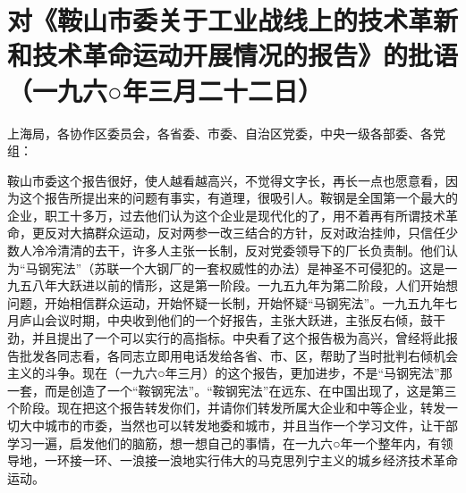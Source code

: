 \section[对《鞍山市委关于工业战线上的技术革新和技术革命运动开展情况的报告》的批语（一九六○年三月二十二日）]{对《鞍山市委关于工业战线上的技术革新和技术革命运动开展情况的报告》的批语（一九六○年三月二十二日）}


上海局，各协作区委员会，各省委、市委、自治区党委，中央一级各部委、各党组：

鞍山市委这个报告很好，使人越看越高兴，不觉得文字长，再长一点也愿意看，因为这个报告所提出来的问题有事实，有道理，很吸引人。鞍钢是全国第一个最大的企业，职工十多万，过去他们认为这个企业是现代化的了，用不着再有所谓技术革命，更反对大搞群众运动，反对两参一改三结合的方针，反对政治挂帅，只信任少数人冷冷清清的去干，许多人主张一长制，反对党委领导下的厂长负责制。他们认为“马钢宪法”（苏联一个大钢厂的一套权威性的办法）是神圣不可侵犯的。这是一九五八年大跃进以前的情形，这是第一阶段。一九五九年为第二阶段，人们开始想问题，开始相信群众运动，开始怀疑一长制，开始怀疑“马钢宪法”。一九五九年七月庐山会议时期，中央收到他们的一个好报告，主张大跃进，主张反右倾，鼓干劲，并且提出了一个可以实行的高指标。中央看了这个报告极为高兴，曾经将此报告批发各同志看，各同志立即用电话发给各省、市、区，帮助了当时批判右倾机会主义的斗争。现在（一九六○年三月）的这个报告，更加进步，不是“马钢宪法”那一套，而是创造了一个“鞍钢宪法”。“鞍钢宪法”在远东、在中国出现了，这是第三个阶段。现在把这个报告转发你们，并请你们转发所属大企业和中等企业，转发一切大中城市的市委，当然也可以转发地委和城市，并且当作一个学习文件，让干部学习一遍，启发他们的脑筋，想一想自己的事情，在一九六○年一个整年内，有领导地，一环接一环、一浪接一浪地实行伟大的马克思列宁主义的城乡经济技术革命运动。


